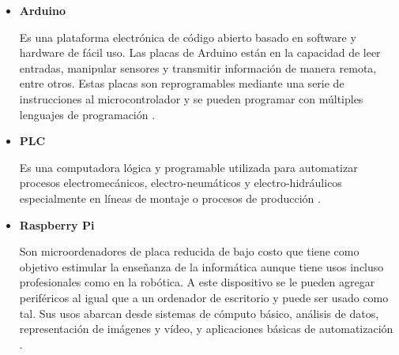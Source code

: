 % 
% 
% 
\begin{itemize}

\item \textbf{Arduino}

Es una plataforma electrónica de código abierto basado en software y hardware de fácil uso. Las placas de Arduino están en la capacidad de leer entradas, manipular sensores y transmitir información de manera remota, entre otros. Estas placas son reprogramables mediante una serie de instrucciones al microcontrolador y se pueden programar con múltiples lenguajes de programación \cite{arduinodef}.

\item \textbf{PLC}

Es una computadora lógica y programable utilizada para automatizar procesos electromecánicos, electro-neumáticos y electro-hidráulicos especialmente en líneas de montaje o procesos de producción\cite{plcref} .

\item \textbf{Raspberry Pi}

Son microordenadores de placa reducida de bajo costo que tiene como objetivo estimular la enseñanza de la informática aunque tiene usos incluso profesionales como en la robótica. A este dispositivo se le pueden agregar periféricos al igual que a un ordenador de escritorio y puede ser usado  como tal. Sus usos abarcan desde sistemas de cómputo básico, análisis de datos, representación de imágenes y vídeo, y aplicaciones básicas de automatización \cite{piref}.



\end{itemize}
